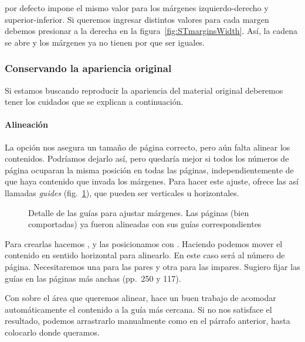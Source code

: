 \documentclass[%
	a5paper,
	10pt,
	twoside,
	openright,
	final,
]{memoir}
\begin{document}
{	\scantailor por defecto impone el mismo valor para los márgenes izquierdo-derecho y superior-inferior. Si queremos ingresar distintos valores para cada margen debemos presionar \keys{\faLink} a la derecha en la figura~\ref{fig:STmarginsWidth}. Así, la cadena se abre \keys{\faUnlink} y los márgenes ya no tienen por que ser iguales.

	\subsubsection{Conservando la apariencia original\label{sec:STmarginsOriginals}} Si estamos buscando reproducir la apariencia del material original deberemos tener los cuidados que se explican a continuación.

	\paragraph{Alineación} La opción  nos asegura un tamaño de página correcto, pero aún falta alinear los contenidos. Podríamos dejarlo así, pero quedaría mejor si todos los números de página ocuparan la misma posición en todas las páginas, independientemente de que haya contenido que invada los márgenes. Para hacer este ajuste, \scantailorAdvanced ofrece las así llamadas \emph{guides} (fig.~\ref{fig:STmarginsGuides}), que pueden ser verticales u horizontales.

	\begin{figure}
		\tiny
		\def\svgwidth{\linewidth}
		\def\svgwidth{\linewidth}
		\caption[Detalle de las guías para ajustar márgenes]{Detalle de las guías para ajustar márgenes. Las páginas (bien comportadas) ya fueron alineadas con sus guías correspondientes\label{fig:STmarginsGuides}}
	\end{figure}

	Para crearlas hacemos , y las posicionamos con . Haciendo  podemos mover el contenido en sentido horizontal para alinearlo. En este caso será al número de página. Necesitaremos una para las pares y otra para las impares. Sugiero fijar las guías en las páginas más anchas (pp.~250 y 117).

	Con \keys{\shift + \,\leftclick\,\leftclick} sobre el área que queremos alinear, \scantailor hace un buen trabajo de acomodar automáticamente el contenido a la guía más cercana. Si no nos satisface el resultado, podemos arrastrarlo manualmente como en el párrafo anterior, hasta colocarlo donde queramos.

}
\end{document}

